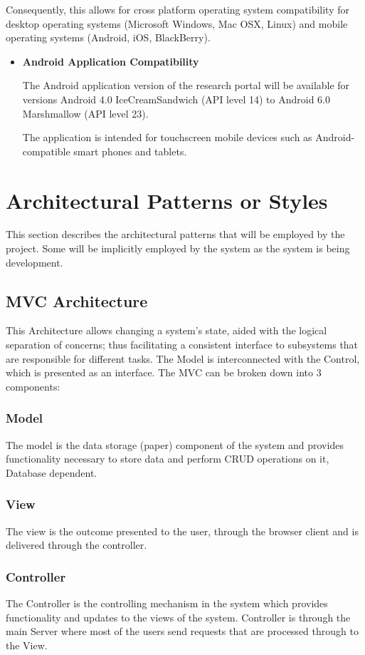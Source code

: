 \documentclass[hidelinks,a4paper,12pt]{article}
\begin{document}
\begin{flushleft}
\begin{itemize}
	Consequently, this allows for cross platform operating system compatibility for desktop operating systems (Microsoft Windows, Mac OSX, Linux) and mobile operating systems (Android, iOS, BlackBerry).
	\end{itemize}
	
\begin{itemize}
	\item 	\textbf{Android Application Compatibility}
		
	The Android application version of the research portal will be available for versions Android 4.0 IceCreamSandwich (API level 14) to Android 6.0 Marshmallow (API level 23).
	
	The application is intended for touchscreen mobile devices such as Android-compatible smart phones and tablets.
\end{itemize} 
\end{flushleft}


\section{Architectural Patterns or Styles}
This section describes the architectural patterns that will be employed by the project.
Some will be implicitly employed by the system as the system is being development.

\subsection{MVC Architecture }
This Architecture allows changing a system's state, aided with the logical separation
of concerns; thus facilitating a consistent interface to subsystems that are responsible for different tasks.
The Model is interconnected with the Control, which is presented as an interface. The MVC can be broken down into 3 components:
\subsubsection{Model}
The model is the data storage (paper) component of the system and provides functionality 
necessary to store data and perform CRUD operations on it, Database dependent.
\subsubsection{View}
The view is the outcome presented to the user, through the browser client and is delivered through the controller.
\subsubsection{Controller}
The Controller is the controlling mechanism in the system which provides functionality and updates to the views of the 
system. Controller is through the main Server where most of the users send requests that are processed through to the View.
\end{document}
